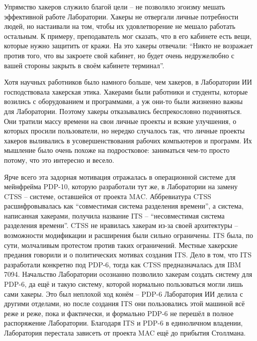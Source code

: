 Упрямство хакеров служило благой цели -- не позволяло эгоизму мешать эффективной работе Лаборатории. Хакеры не отвергали личные потребности людей, но настаивали на том, чтобы их удовлетворение не мешало работать остальным. К примеру, преподаватель мог сказать, что в его кабинете есть вещи, которые нужно защитить от кражи. На это хакеры отвечали: \enquote{Никто не возражает против того, что вы закроете свой кабинет, но будет очень недружелюбно с вашей стороны закрыть в своём кабинете терминал}.

Хотя научных работников было намного больше, чем хакеров, в Лаборатории ИИ господствовала хакерская этика. Хакерами были работники и студенты, которые возились с оборудованием и программами, а уж они-то были жизненно важны для Лаборатории. Поэтому хакеры отказывались беспрекословно подчиняться. Они тратили массу времени на свои личные проекты и всякие улучшения, о которых просили пользователи, но нередко случалось так, что личные проекты хакеров выливались в усовершенствования рабочих компьютеров и программ. Их мышление было очень похоже на подростковое: заниматься чем-то просто потому, что это интересно и весело.

Ярче всего эта задорная мотивация отражалась в операционной системе для мейнфрейма PDP-10, которую разработали тут же, в Лаборатории на замену CTSS -- системе, оставшейся от проекта MAC. Аббревиатура CTSS расшифровывалась как \enquote{совместимая система разделения времени}, а система, написанная хакерами, получила название ITS -- \enquote{несовместимая система разделения времени}. CTSS не нравилась хакерам из-за своей архитектуры -- возможности модификации и расширения были сильно ограничены. ITS была, по сути, молчаливым протестом против таких ограничений. Местные хакерские предания говорили и о политических мотивах создания ITS. Дело в том, что ITS разработали конкретно под PDP-6, тогда как CTSS предназначалась для IBM 7094. Начальство Лаборатории осознанно позволило хакерам создать систему для PDP-6, да ещё и такую систему, которой нормально пользоваться могли лишь сами хакеры. Это был неплохой ход конём -- PDP-6 Лаборатория ИИ делила с другими отделами, но после создания ITS они пользовались этой машиной всё реже и реже, пока и фактически, и формально PDP-6 не перешёл в полное распоряжение Лаборатории. Благодаря ITS и PDP-6 в единоличном владении, Лаборатория перестала зависеть от проекта MAC ещё до прибытия Столлмана.

